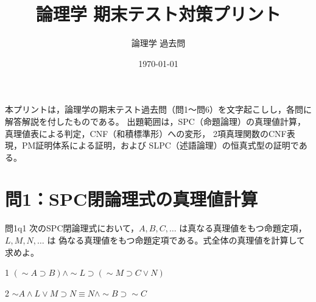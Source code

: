 \documentclass[autodetect-engine,dvi=dvipdfmx,ja=standard]{bxjsarticle}
\title{論理学 期末テスト対策プリント}
\author{論理学 過去問}
\date{\today}
\begin{document}
\maketitle

本プリントは，論理学の期末テスト過去問（問1〜問6）を文字起こしし，各問に解答解説を付したものである。
出題範囲は，SPC（命題論理）の真理値計算，真理値表による判定，CNF（和積標準形）への変形，
2項真理関数のCNF表現，PM証明体系による証明，および SLPC（述語論理）の恒真式型の証明である。

\section{問1：SPC閉論理式の真理値計算}

\begin{exercise}{問1}{q1}
次のSPC閉論理式において，\(A,B,C,\ldots\) は真なる真理値をもつ命題定項，\(L,M,N,\ldots\) は
偽なる真理値をもつ命題定項である。式全体の真理値を計算して求めよ。
\begin{pstep}{1}
  \((\sim A\supset B)\land\sim L\supset(\sim M\supset C\lor N)\)
\end{pstep}
\begin{pstep}{2}
  \(\sim A\land L\lor M\supset N\equiv N\land\sim B\supset\sim C\)
\end{pstep}
\end{exercise}
\end{document}
